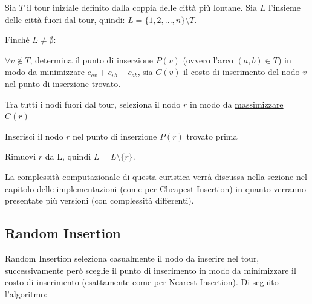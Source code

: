 \documentclass[a4paper,12pt]{report}
\begin{document}
\begin{tcolorbox}[colframe=black,colback=white,boxrule=0.5pt, sharp corners]
\begin{legal}
  \item Sia $T$ il tour iniziale definito dalla coppia delle città più lontane. Sia $L$ l'insieme delle città fuori dal tour, quindi: $L = \{1, 2, ..., n\} \setminus T$.
  \item Finché $L \neq \emptyset$:
  \begin{legal}
    \item $\forall v \not \in T$, determina il punto di inserzione $P(v)$ (ovvero l'arco $(a, b) \in T$) in modo da \underline{minimizzare} $c_{av} + c_{vb} - c_{ab}$, sia $C(v)$ il costo di inserimento del nodo $v$ nel punto di inserzione trovato.
    \item Tra tutti i nodi fuori dal tour, seleziona il nodo $r$ in modo da \underline{massimizzare} $C(r)$
    \item Inserisci il nodo $r$ nel punto di inserzione $P(r)$ trovato prima
    \item Rimuovi $r$ da L, quindi $L = L \setminus \{r\}$.
  \end{legal}
\end{legal}
\end{tcolorbox}
\hfill \break La complessità computazionale di questa euristica verrà discussa nella sezione nel capitolo delle implementazioni (come per Cheapest Insertion) in quanto verranno presentate più versioni (con complessità differenti).

\subsection{Random Insertion} \label{ssec:RI}
Random Insertion seleziona casualmente il nodo da inserire nel tour, successivamente però sceglie il punto di inserimento in modo da minimizzare il costo di inserimento (esattamente come per Nearest Insertion). Di seguito l'algoritmo:
\end{document}
